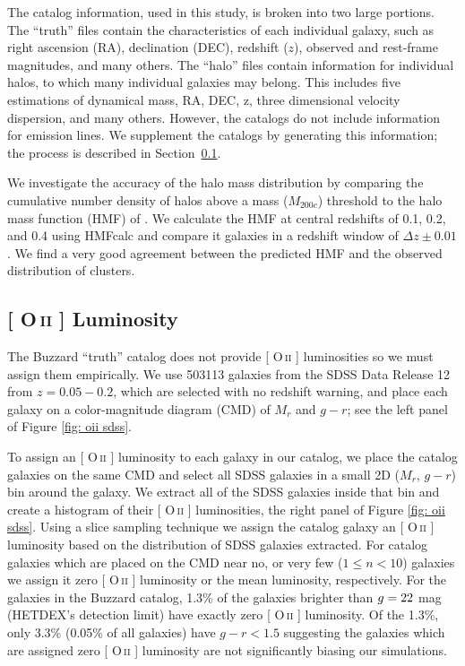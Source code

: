 \documentclass[fleqn,usenatbib]{mnras}
\makeatletter
\DeclareRobustCommand{\ion}[2]{%
\relax\ifmmode
\ifx\testbx\f@series
{\mathbf{#1\,\mathsc{#2}}}\else
{\mathrm{#1\,\mathsc{#2}}}\fi
\else\textup{#1\,{\mdseries\textsc{#2}}}%
\fi}
\makeatother
\begin{document}
The catalog information, used in this study, is broken into two large portions. The ``truth'' files contain the characteristics of each individual galaxy, such as right ascension (RA), declination (DEC), redshift ($z$), observed and rest-frame magnitudes, and many others. The ``halo'' files contain information for individual halos, to which many individual galaxies may belong. This includes five estimations of dynamical mass, RA, DEC, z, three dimensional velocity dispersion, and many others. However, the catalogs do not include information for emission lines. We supplement the catalogs by generating this information; the process is described in Section~\ref{sec: oii luminosity}.


We investigate the accuracy of the halo mass distribution by comparing the cumulative number density of halos above a mass ($M_{200c}$) threshold to the halo mass function (HMF) of \cite{Tinker2008}. We calculate the HMF at central redshifts of 0.1, 0.2, and 0.4 using {\sc HMFcalc} \citep{Murray2013} and compare it galaxies in a redshift window of $\Delta z\pm0.01$. We find a very good agreement between the predicted HMF and the observed distribution of clusters.

\subsection{ {\rm[\ion{O}{ii}]} Luminosity}\label{sec: oii luminosity}
The Buzzard ``truth'' catalog does not provide [\ion{O}{ii}] luminosities so we must assign them empirically. We use 503113 galaxies from the SDSS Data Release 12 \citep{Alam2015} from $z = 0.05 - 0.2$, which are selected with no redshift warning, and place each galaxy on a color-magnitude diagram (CMD) of $M_r$ and $g-r$; see the left panel of Figure \ref{fig: oii sdss}.

To assign an [\ion{O}{ii}] luminosity to each galaxy in our catalog, we place the catalog galaxies on the same CMD and select all SDSS galaxies in a small 2D ($M_r$, $g-r$) bin around the galaxy. We extract all of the SDSS galaxies inside that bin and create a histogram of their [\ion{O}{ii}] luminosities, the right panel of Figure \ref{fig: oii sdss}. Using a slice sampling technique \citep{Neal1997} we assign the catalog galaxy an [\ion{O}{ii}] luminosity based on the distribution of SDSS galaxies extracted. For catalog galaxies which are placed on the CMD near no, or very few ($1\leq n<10$) galaxies we assign it zero [\ion{O}{ii}] luminosity or the mean luminosity, respectively. For the galaxies in the Buzzard catalog, 1.3\% of the galaxies brighter than $\hbox{$g$} = 22$ mag (HETDEX's detection limit) have exactly zero [\ion{O}{ii}] luminosity. Of the 1.3\%, only 3.3\% (0.05\% of all galaxies) have $g-r < 1.5$ suggesting the galaxies which are assigned zero [\ion{O}{ii}] luminosity are not significantly biasing our simulations.
\end{document}
